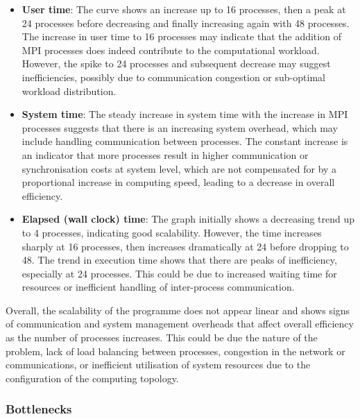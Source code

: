 \documentclass[
]{article}
\begin{document}
\begin{itemize}
\item
  \textbf{User time}: The curve shows an increase up to 16 processes,
  then a peak at 24 processes before decreasing and finally increasing
  again with 48 processes. The increase in user time to 16 processes may
  indicate that the addition of MPI processes does indeed contribute to
  the computational workload. However, the spike to 24 processes and
  subsequent decrease may suggest inefficiencies, possibly due to
  communication congestion or sub-optimal workload distribution.
\item
  \textbf{System time}: The steady increase in system time with the
  increase in MPI processes suggests that there is an increasing system
  overhead, which may include handling communication between processes.
  The constant increase is an indicator that more processes result in
  higher communication or synchronisation costs at system level, which
  are not compensated for by a proportional increase in computing speed,
  leading to a decrease in overall efficiency.
\item
  \textbf{Elapsed (wall clock) time}: The graph initially shows a
  decreasing trend up to 4 processes, indicating good scalability.
  However, the time increases sharply at 16 processes, then increases
  dramatically at 24 before dropping to 48. The trend in execution time
  shows that there are peaks of inefficiency, especially at 24
  processes. This could be due to increased waiting time for resources
  or inefficient handling of inter-process communication.
\end{itemize}

Overall, the scalability of the programme does not appear linear and
shows signs of communication and system management overheads that affect
overall efficiency as the number of processes increases. This could be
due the nature of the problem, lack of load balancing between processes,
congestion in the network or communications, or inefficient utilisation
of system resources due to the configuration of the computing topology.

\subsubsection{Bottlenecks}\label{bottlenecks-1}
\end{document}
